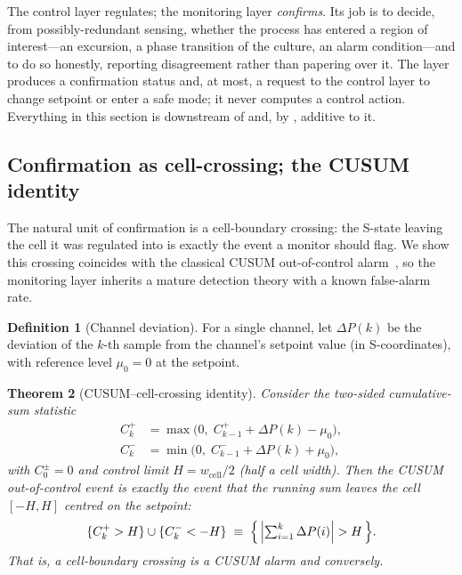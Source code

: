 \documentclass[11pt,a4paper,twocolumn]{article}
\theoremstyle{thmstyle}
\newtheorem{theorem}{Theorem}[section]
\theoremstyle{definition}
\newtheorem{definition}[theorem]{Definition}
\theoremstyle{remark}
\newcommand{\DP}{\Delta P}
\newcommand{\wcell}{w_{\mathrm{cell}}}
\begin{document}
The control layer regulates; the monitoring layer \emph{confirms}. Its
job is to decide, from possibly-redundant sensing, whether the process
has entered a region of interest---an excursion, a phase transition of
the culture, an alarm condition---and to do so honestly, reporting
disagreement rather than papering over it. The layer produces a
confirmation status and, at most, a request to the control layer to
change setpoint or enter a safe mode; it never computes a control action.
Everything in this section is downstream of  and, by
, additive to it.

\subsection{Confirmation as cell-crossing; the CUSUM identity}

The natural unit of confirmation is a cell-boundary crossing: the S-state
leaving the cell it was regulated into is exactly the event a monitor
should flag. We show this crossing coincides with the classical CUSUM
out-of-control alarm~\citep{page1954continuous,montgomery2020spc}, so the
monitoring layer inherits a mature detection theory with a known
false-alarm rate.

\begin{definition}[Channel deviation]
\label{def:deviation}
For a single channel, let $\DP(k)$ be the deviation of the $k$-th sample
from the channel's setpoint value (in S-coordinates), with reference
level $\mu_0=0$ at the setpoint.
\end{definition}

\begin{theorem}[CUSUM--cell-crossing identity]
\label{thm:cusum}
Consider the two-sided cumulative-sum statistic
\begin{align*}
C_k^{+}&=\max\!\bigl(0,\;C_{k-1}^{+}+\DP(k)-\mu_0\bigr),\\
C_k^{-}&=\min\!\bigl(0,\;C_{k-1}^{-}+\DP(k)+\mu_0\bigr),
\end{align*}
with $C_0^{\pm}=0$ and control limit $H=\wcell/2$ (half a cell width).
Then the CUSUM out-of-control event is exactly the event that the running
sum leaves the cell $[-H,H]$ centred on the setpoint:
\begin{equation}
\label{eq:cusum}
\{C_k^{+}>H\}\cup\{C_k^{-}<-H\}
\;\equiv\;
\Bigl\{\,\Bigl|\textstyle\sum_{i=1}^{k}\DP(i)\Bigr|>H\,\Bigr\}.
\end{equation}
That is, a cell-boundary crossing is a CUSUM alarm and conversely.
\end{theorem}
\end{document}
